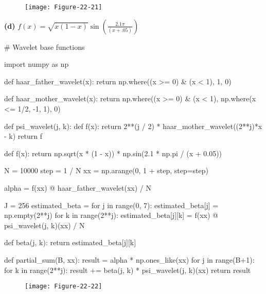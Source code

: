 \begin{figure}[H]
\centering
\texttt{[image: Figure-22-21]}
\end{figure}

\textbf{(d)} $f(x) = \sqrt{x(1-x)} \sin \left(
\frac{2.1 \pi}{(x + .05)} \right) $

\begin{python}
# Wavelet base functions

import numpy as np

def haar_father_wavelet(x):
    return np.where((x >= 0) & (x < 1), 1, 0)

def haar_mother_wavelet(x):
    return np.where((x >= 0) & (x < 1), np.where(x <= 1/2, -1, 1), 0)

def psi_wavelet(j, k):
    def f(x):
        return 2**(j / 2) * haar_mother_wavelet((2**j)*x - k)
    return f
\end{python}

\begin{python}
def f(x):
    return np.sqrt(x * (1 - x)) * np.sin(2.1 * np.pi / (x + 0.05))
\end{python}

\begin{python}
N = 10000
step = 1 / N
xx = np.arange(0, 1 + step, step=step)

alpha = f(xx) @ haar_father_wavelet(xx) / N

J = 256
estimated_beta = {}
for j in range(0, 7):
    estimated_beta[j] = np.empty(2**j)
    for k in range(2**j):
        estimated_beta[j][k] = f(xx) @ psi_wavelet(j, k)(xx) / N
    
def beta(j, k):
    return estimated_beta[j][k]
\end{python}

\begin{python}
def partial_sum(B, xx):
    result = alpha * np.ones_like(xx)
    for j in range(B+1):
        for k in range(2**j):
            result += beta(j, k) * psi_wavelet(j, k)(xx)
    return result
\end{python}


\begin{figure}[H]
\centering
\texttt{[image: Figure-22-22]}
\end{figure}
